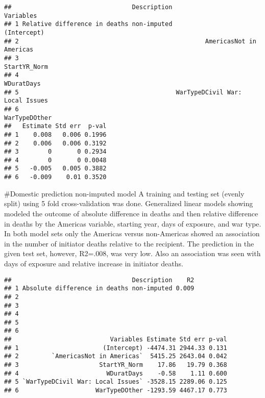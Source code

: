 \documentclass[
]{article}
\begin{document}
\begin{verbatim}
##                                 Description                       Variables
## 1 Relative difference in deaths non-imputed                     (Intercept)
## 2                                                   AmericasNot in Americas
## 3                                                              StartYR_Norm
## 4                                                                WDuratDays
## 5                                           WarTypeDCivil War: Local Issues
## 6                                                             WarTypeDOther
##   Estimate Std err  p-val
## 1    0.008   0.006 0.1996
## 2    0.006   0.006 0.3192
## 3        0       0 0.2934
## 4        0       0 0.0048
## 5   -0.005   0.005 0.3882
## 6   -0.009    0.01 0.3520
\end{verbatim}

\#Domestic prediction non-imputed model A training and testing set
(evenly split) using 5 fold cross-validation was done. Generalized
linear models showing modeled the outcome of absolute difference in
deaths and then relative difference in deaths by the Americas variable,
starting year, days of exposure, and war type. In both model sets only
the Americas versus non-Americas showed an association in the number of
initiator deaths relative to the recipient. The prediction in the given
test set, however, R2=.008, was very low. Also an association was seen
with days of exposure and relative increase in initiator deaths.

\begin{verbatim}
##                                 Description    R2
## 1 Absolute difference in deaths non-imputed 0.009
## 2                                                
## 3                                                
## 4                                                
## 5                                                
## 6                                                
##                           Variables Estimate Std err p-val
## 1                       (Intercept) -4474.31 2944.33 0.131
## 2         `AmericasNot in Americas`  5415.25 2643.04 0.042
## 3                      StartYR_Norm    17.86   19.79 0.368
## 4                        WDuratDays    -0.58    1.11 0.600
## 5 `WarTypeDCivil War: Local Issues` -3528.15 2289.06 0.125
## 6                     WarTypeDOther -1293.59 4467.17 0.773
\end{verbatim}
\end{document}
